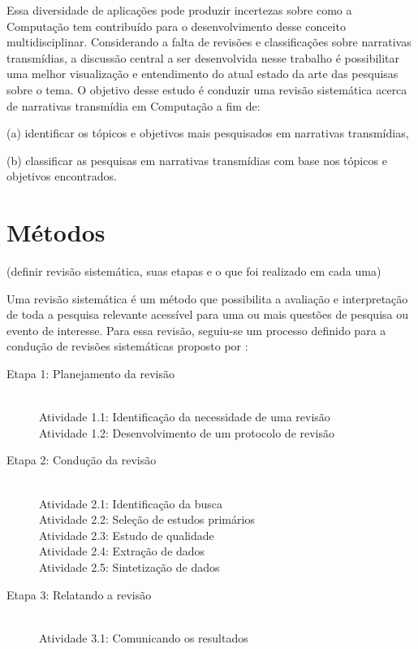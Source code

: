 \documentclass[
article,			%
11pt,				%
oneside,			%
a4paper,			%
english,			%
brazil,				%
sumario=tradicional
]{abntex2}
\begin{document}
  Essa diversidade de aplicações pode produzir incertezas sobre como a Computação tem contribuído para o desenvolvimento desse conceito multidisciplinar. Considerando a falta de revisões e classificações sobre narrativas transmídias, a discussão central a ser desenvolvida nesse trabalho é possibilitar uma melhor visualização e entendimento do atual estado da arte das pesquisas sobre o tema.  O objetivo desse estudo é conduzir uma revisão sistemática acerca de narrativas transmídia em Computação a fim de:

  (a) identificar os tópicos e objetivos mais pesquisados em narrativas transmídias,

  (b) classificar as pesquisas em narrativas transmídias com base nos tópicos e objetivos encontrados.

  \section{Métodos}

  \textsf{(definir revisão sistemática, suas etapas e o que foi realizado em cada uma)}

  Uma revisão sistemática é um método que possibilita a avaliação e interpretação de toda a pesquisa relevante acessível para uma ou mais questões de pesquisa ou evento de interesse. Para essa revisão, seguiu-se um processo definido para a condução de revisões sistemáticas proposto por :

  \begin{description}
    \item[Etapa 1: Planejamento da revisão] \hfill \\
    Atividade 1.1: Identificação da necessidade de uma revisão \\
    Atividade 1.2: Desenvolvimento de um protocolo de revisão
    \item[Etapa 2: Condução da revisão] \hfill \\
    Atividade 2.1: Identificação da busca \\
    Atividade 2.2: Seleção de estudos primários \\
    Atividade 2.3: Estudo de qualidade \\
    Atividade 2.4: Extração de dados \\
    Atividade 2.5: Sintetização de dados
    \item[Etapa 3: Relatando a revisão] \hfill \\
    Atividade 3.1: Comunicando os resultados
  \end{description}
\end{document}
